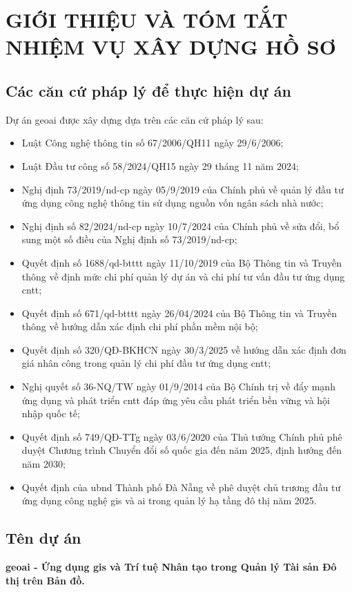 \section{GIỚI THIỆU VÀ TÓM TẮT NHIỆM VỤ XÂY DỰNG HỒ SƠ
}
\subsection{Các căn cứ pháp lý để thực hiện dự án}
Dự án \gls{geoai} được xây dựng dựa trên các căn cứ pháp lý sau:
\begin{itemize}
    \item Luật Công nghệ thông tin số 67/2006/QH11 ngày 29/6/2006;
    \item Luật Đầu tư công số 58/2024/QH15 ngày 29 tháng 11 năm 2024;
    \item Nghị định 73/2019/\gls{nd-cp} ngày 05/9/2019 của Chính phủ về quản lý đầu tư ứng dụng công nghệ thông tin sử dụng nguồn vốn ngân sách nhà nước;
    \item Nghị định số 82/2024/\gls{nd-cp} ngày 10/7/2024 của Chính phủ về sửa đổi, bổ sung một số điều của Nghị định số 73/2019/\gls{nd-cp};
    \item Quyết định số 1688/\gls{qd-btttt} ngày 11/10/2019 của Bộ Thông tin và Truyền thông về định mức chi phí quản lý dự án và chi phí tư vấn đầu tư ứng dụng \gls{cntt};
    \item Quyết định số 671/\gls{qd-btttt} ngày 26/04/2024 của Bộ Thông tin và Truyền thông về hướng dẫn xác định chi phí phần mềm nội bộ;
    \item Quyết định số 320/QĐ-BKHCN ngày 30/3/2025 về hướng dẫn xác định đơn giá nhân công trong quản lý chi phí đầu tư ứng dụng \gls{cntt};
    \item Nghị quyết số 36-NQ/TW ngày 01/9/2014 của Bộ Chính trị về đẩy mạnh ứng dụng và phát triển \gls{cntt} đáp ứng yêu cầu phát triển bền vững và hội nhập quốc tế;
    \item Quyết định số 749/QĐ-TTg ngày 03/6/2020 của Thủ tướng Chính phủ phê duyệt Chương trình Chuyển đổi số quốc gia đến năm 2025, định hướng đến năm 2030;
    \item Quyết định của \gls{ubnd} Thành phố Đà Nẵng về phê duyệt chủ trương đầu tư ứng dụng công nghệ \gls{gis} và \gls{ai} trong quản lý hạ tầng đô thị năm 2025.
\end{itemize}

\subsection{Tên dự án}
\textbf{\gls{geoai} - Ứng dụng \gls{gis} và Trí tuệ Nhân tạo trong Quản lý Tài sản Đô thị trên Bản đồ.}


